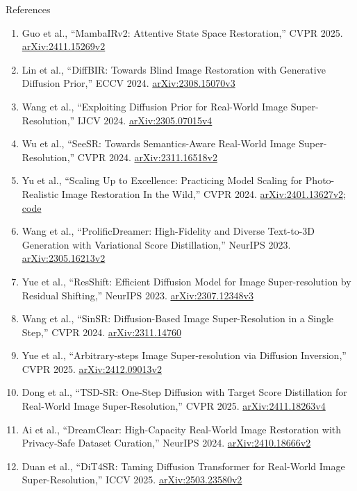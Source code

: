 \begin{frame}[allowframebreaks=0.9]{References}
\begin{enumerate}
    \item Guo et al., ``MambaIRv2: Attentive State Space Restoration,'' CVPR 2025. \href{https://arxiv.org/abs/2411.15269v2}{arXiv:2411.15269v2}
    \item Lin et al., ``DiffBIR: Towards Blind Image Restoration with Generative Diffusion Prior,'' ECCV 2024. \href{https://arxiv.org/abs/2308.15070v3}{arXiv:2308.15070v3}
    \item Wang et al., ``Exploiting Diffusion Prior for Real-World Image Super-Resolution,'' IJCV 2024. \href{https://arxiv.org/abs/2305.07015v4}{arXiv:2305.07015v4}
    \item Wu et al., ``SeeSR: Towards Semantics-Aware Real-World Image Super-Resolution,'' CVPR 2024. \href{https://arxiv.org/abs/2311.16518v2}{arXiv:2311.16518v2}
    \item Yu et al., ``Scaling Up to Excellence: Practicing Model Scaling for Photo-Realistic Image Restoration In the Wild,'' CVPR 2024. \href{https://arxiv.org/abs/2401.13627v2}{arXiv:2401.13627v2}; \href{https://github.com/Fanghua-Yu/SUPIR}{code}
    \item Wang et al., ``ProlificDreamer: High-Fidelity and Diverse Text-to-3D Generation with Variational Score Distillation,'' NeurIPS 2023. \href{https://arxiv.org/abs/2305.16213v2}{arXiv:2305.16213v2}
    \item Yue et al., ``ResShift: Efficient Diffusion Model for Image Super-resolution by Residual Shifting,'' NeurIPS 2023. \href{https://arxiv.org/abs/2307.12348v3}{arXiv:2307.12348v3}
    \item Wang et al., ``SinSR: Diffusion-Based Image Super-Resolution in a Single Step,'' CVPR 2024. \href{https://arxiv.org/abs/2311.14760}{arXiv:2311.14760}
    \item Yue et al., ``Arbitrary-steps Image Super-resolution via Diffusion Inversion,'' CVPR 2025. \href{https://arxiv.org/abs/2412.09013v2}{arXiv:2412.09013v2}
    \item Dong et al., ``TSD-SR: One-Step Diffusion with Target Score Distillation for Real-World Image Super-Resolution,'' CVPR 2025. \href{https://arxiv.org/abs/2411.18263v4}{arXiv:2411.18263v4}
    \item Ai et al., ``DreamClear: High-Capacity Real-World Image Restoration with Privacy-Safe Dataset Curation,'' NeurIPS 2024. \href{https://arxiv.org/abs/2410.18666v2}{arXiv:2410.18666v2}
    \item Duan et al., ``DiT4SR: Taming Diffusion Transformer for Real-World Image Super-Resolution,'' ICCV 2025. \href{https://arxiv.org/abs/2503.23580v2}{arXiv:2503.23580v2}

\end{enumerate}
\end{frame}
